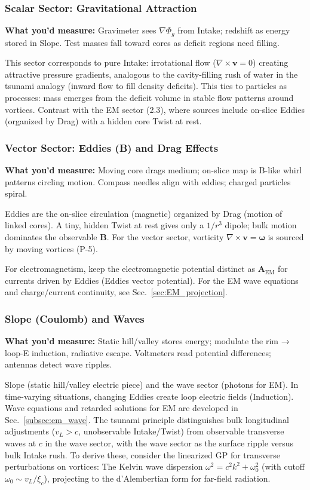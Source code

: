 \subsubsection{Scalar Sector: Gravitational Attraction}

\textbf{What you'd measure:} Gravimeter sees $\nabla\Phi_g$ from Intake; redshift as energy stored in Slope. Test masses fall toward cores as deficit regions need filling.

This sector corresponds to pure Intake: irrotational flow ($\nabla \times \mathbf{v} = 0$) creating attractive pressure gradients, analogous to the cavity-filling rush of water in the tsunami analogy (inward flow to fill density deficits). This ties to particles as processes: mass emerges from the deficit volume in stable flow patterns around vortices. Contrast with the EM sector (2.3), where sources include on-slice Eddies (organized by Drag) with a hidden core Twist at rest.

\subsubsection{Vector Sector: Eddies (B) and Drag Effects}

\textbf{What you'd measure:} Moving core drags medium; on-slice map is B-like whirl patterns circling motion. Compass needles align with eddies; charged particles spiral.

Eddies are the on-slice circulation (magnetic) organized by Drag (motion of linked cores). A tiny, hidden Twist at rest gives only a $1/r^3$ dipole; bulk motion dominates the observable $\mathbf B$. For the vector sector, vorticity $\nabla \times \mathbf{v} = \boldsymbol{\omega}$ is sourced by moving vortices (P-5).

For electromagnetism, keep the electromagnetic potential distinct as $\mathbf A_{\text{EM}}$ for currents driven by Eddies (Eddies vector potential). For the EM wave equations and charge/current continuity, see Sec.~\ref{sec:EM_projection}.

\subsubsection{Slope (Coulomb) and Waves}

\textbf{What you'd measure:} Static hill/valley stores energy; modulate the rim → loop-E induction, radiative escape. Voltmeters read potential differences; antennas detect wave ripples.

Slope (static hill/valley electric piece) and the wave sector (photons for EM). In time-varying situations, changing Eddies create loop electric fields (Induction). Wave equations and retarded solutions for EM are developed in Sec.~\ref{subsec:em_wave}. The tsunami principle distinguishes bulk longitudinal adjustments ($v_L > c$, unobservable Intake/Twist) from observable transverse waves at $c$ in the wave sector, with the wave sector as the surface ripple versus bulk Intake rush. To derive these, consider the linearized GP for transverse perturbations on vortices: The Kelvin wave dispersion $\omega^2 = c^2 k^2 + \omega_0^2$ (with cutoff $\omega_0 \sim v_L / \xi_c$), projecting to the d'Alembertian form for far-field radiation.

